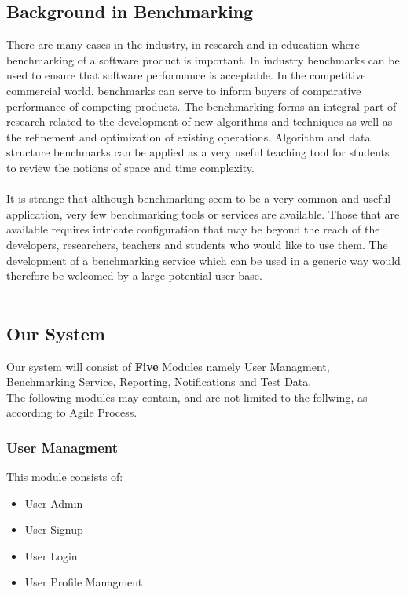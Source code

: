 \subsection{Background in Benchmarking}
There are many cases in the industry, in research and in education where benchmarking of
a software product is important. In industry benchmarks can be used to ensure that software
performance is acceptable. In the competitive commercial world, benchmarks can serve to inform
buyers of comparative performance of competing products. The benchmarking forms an integral
part of research related to the development of new algorithms and techniques as well as the refinement
and optimization of existing operations. Algorithm and data structure benchmarks can be applied
as a very useful teaching tool for students to review the notions of space and time complexity.
\\
\\
It is strange that although benchmarking seem to be a very common and useful application, very few benchmarking tools or services are available. Those that are available requires intricate configuration that may be beyond the reach of the developers, researchers,
teachers and students who would like to use them. The development of a benchmarking service which can be used in a generic way would therefore be welcomed by a large
potential user base.
\\
\\
\subsection{Our System}
Our system will consist of \textbf{Five} Modules namely User Managment, Benchmarking Service, Reporting, Notifications and Test Data.\\
The following modules may contain, and are not limited to the follwing, as according to Agile Process.

\subsubsection{User Managment}
This module consists of:
\begin{itemize}
  \item User Admin
  \item User Signup
  \item User Login
  \item User Profile Managment
\end{itemize}

